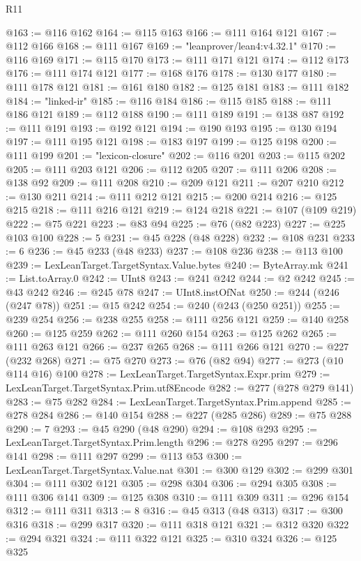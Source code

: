 \begin{lexlean}{R11}
\begin{coremodule}
{{{{{{{{{{{{{{{{{{{{{{{{{{{{{{{{{{{{{{{{{{{{{{{{{{{{{{{{{{{{{{{{{{{{{{{{{{{{{{{{{{@163 := @116 @162
@164 := @115 @163
@166 := @111 @164 @121
@167 := @112 @166
@168 := @111 @167
@169 := "leanprover/lean4:v4.32.1"
@170 := @116 @169
@171 := @115 @170
@173 := @111 @171 @121
@174 := @112 @173
@176 := @111 @174 @121
@177 := @168 @176
@178 := @130 @177
@180 := @111 @178 @121
@181 := @161 @180
@182 := @125 @181
@183 := @111 @182
@184 := "linked-ir"
@185 := @116 @184
@186 := @115 @185
@188 := @111 @186 @121
@189 := @112 @188
@190 := @111 @189
@191 := @138 @87
@192 := @111 @191
@193 := @192 @121
@194 := @190 @193
@195 := @130 @194
@197 := @111 @195 @121
@198 := @183 @197
@199 := @125 @198
@200 := @111 @199
@201 := "lexicon-closure"
@202 := @116 @201
@203 := @115 @202
@205 := @111 @203 @121
@206 := @112 @205
@207 := @111 @206
@208 := @138 @92
@209 := @111 @208
@210 := @209 @121
@211 := @207 @210
@212 := @130 @211
@214 := @111 @212 @121
@215 := @200 @214
@216 := @125 @215
@218 := @111 @216 @121
@219 := @124 @218
@221 := @107 (@109 @219)
@222 := @75 @221
@223 := @83 @94
@225 := @76 (@82 @223)
@227 := @225 @103 @100
@228 := 5
@231 := @45 @228 (@48 @228)
@232 := @108 @231
@233 := 6
@236 := @45 @233 (@48 @233)
@237 := @108 @236
@238 := @113 @100
@239 := LexLeanTarget.TargetSyntax.Value.bytes
@240 := ByteArray.mk
@241 := List.toArray.{0}
@242 := UInt8
@243 := @241 @242
@244 := @2 @242
@245 := @43 @242
@246 := @245 @78
@247 := UInt8.instOfNat
@250 := @244 (@246 (@247 @78))
@251 := @15 @242
@254 := @240 (@243 (@250 @251))
@255 := @239 @254
@256 := @238 @255
@258 := @111 @256 @121
@259 := @140 @258
@260 := @125 @259
@262 := @111 @260 @154
@263 := @125 @262
@265 := @111 @263 @121
@266 := @237 @265
@268 := @111 @266 @121
@270 := @227 (@232 @268)
@271 := @75 @270
@273 := @76 (@82 @94)
@277 := @273 (@10 @114 @16) @100
@278 := LexLeanTarget.TargetSyntax.Expr.prim
@279 := LexLeanTarget.TargetSyntax.Prim.utf8Encode
@282 := @277 (@278 @279 @141)
@283 := @75 @282
@284 := LexLeanTarget.TargetSyntax.Prim.append
@285 := @278 @284
@286 := @140 @154
@288 := @227 (@285 @286)
@289 := @75 @288
@290 := 7
@293 := @45 @290 (@48 @290)
@294 := @108 @293
@295 := LexLeanTarget.TargetSyntax.Prim.length
@296 := @278 @295
@297 := @296 @141
@298 := @111 @297
@299 := @113 @53
@300 := LexLeanTarget.TargetSyntax.Value.nat
@301 := @300 @129
@302 := @299 @301
@304 := @111 @302 @121
@305 := @298 @304
@306 := @294 @305
@308 := @111 @306 @141
@309 := @125 @308
@310 := @111 @309
@311 := @296 @154
@312 := @111 @311
@313 := 8
@316 := @45 @313 (@48 @313)
@317 := @300 @316
@318 := @299 @317
@320 := @111 @318 @121
@321 := @312 @320
@322 := @294 @321
@324 := @111 @322 @121
@325 := @310 @324
@326 := @125 @325
}}}}}}}}}}}}}}}}}}}}}}}}}}}}}}}}}}}}}}}}}}}}}}}}}}}}}}}}}}}}}}}}}}}}}}}}}}}}}}}}}}
\end{coremodule}
\end{lexlean}
